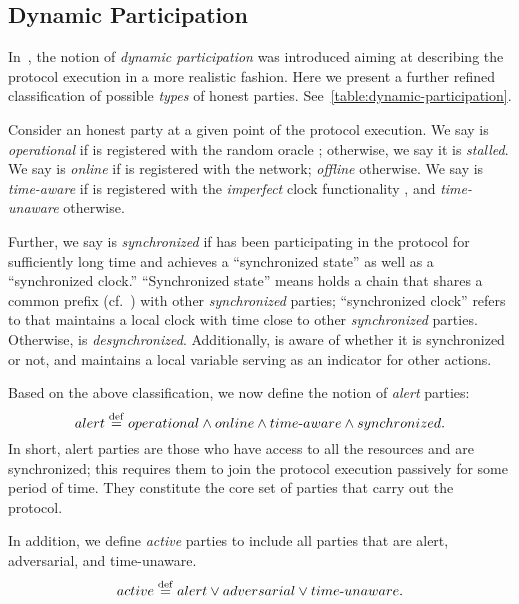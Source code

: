 \subsection{Dynamic Participation}
\label{subsec:dynamic-participation}

In~\cite{CCS:BGKRZ18,EC:BGKRZ21}, the notion of \emph{dynamic participation} was introduced aiming at describing the protocol execution in a more realistic fashion.
%
Here we present a further refined classification of possible \emph{types} of honest parties.
%
See~\cref{table:dynamic-participation}.



Consider an honest party \party at a given point of the protocol execution.
%
We say \party is \emph{operational} if \party is registered with the random oracle \funcRO; otherwise, we say it is \emph{stalled}.
%
We say \party is \emph{online} if \party is registered with the network; \emph{offline} otherwise.
%
We say \party is \emph{time-aware} if \party is registered with the \emph{imperfect} clock functionality \funcImpClock, and \emph{time-unaware} otherwise.

Further, we say \party is \emph{synchronized} if \party has been participating in the protocol for sufficiently long time and achieves a ``synchronized state'' as well as a ``synchronized clock.''
%
``Synchronized state'' means \party holds a chain that shares a common prefix (cf.~\cite{EC:GarKiaLeo15}) with other \emph{synchronized} parties; ``synchronized clock'' refers to that \party maintains a local clock with time close to other \emph{synchronized} parties.
%
Otherwise, \party is \emph{desynchronized}.
%
Additionally, \party is aware of whether it is synchronized or not, and maintains a local variable \isSync serving as an indicator for other actions.

Based on the above classification, we now define the notion of \emph{alert} parties:
%
\[ alert \overset{\mathrm{def}}{=} operational \wedge online \wedge time\text{-}aware  \wedge synchronized. \]
%
In short, alert parties are those who have access to all the resources and are synchronized; this requires them to join the protocol execution passively for some period of time.
%
They constitute the core set of parties that carry out the protocol.

In addition, we define \emph{active} parties to include all parties that are alert, adversarial, and time-unaware.
%
\[ active \overset{\mathrm{def}}{=} alert \vee adversarial \vee time\text{-}unaware. \]

